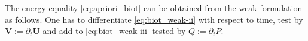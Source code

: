 \documentclass[a4paper]{article}
\numberwithin{equation}{section}
\def\dt{\prtl_t}
\def\prtl{\partial}
\def\U{\vc U}
\def\V{\vc V}
\def\vc#1{\mathbf{#1}}     %
\begin{document}
The energy equality \eqref{eq:apriori_biot} can be obtained from the weak formulation as follows.
One has to differentiate \eqref{eq:biot_weak-ii} with respect to time, test by $\V:=\dt\U$ and add to \eqref{eq:biot_weak-iii} tested by $Q:=\dt P$.








\end{document}

